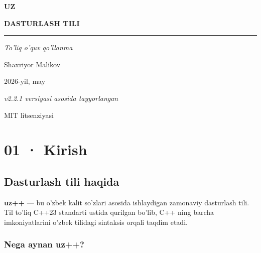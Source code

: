 \documentclass[a4paper,11pt,twoside,openright]{book}
\begin{document}
\frontmatter

\begin{titlepage}
\centering
\vspace*{2.5cm}

{\fontsize{96pt}{96pt}\selectfont\bfseries\sffamily\color{titlecolor}UZ\raisebox{-0.15em}{++}\par}

\vspace{1cm}

{\Huge\bfseries\sffamily\color{titlecolor}DASTURLASH TILI\par}

\vspace{0.5cm}
{\color{rulecolor}\rule{0.5\textwidth}{1pt}\par}
\vspace{1.5cm}

{\LARGE\itshape To'liq o'quv qo'llanma\par}

\vspace{4cm}

{\Large\sffamily Shaxriyor Malikov\par}
\vspace{0.5cm}
{\large 2026-yil, may\par}

\vfill

{\small\itshape v2.2.1 versiyasi asosida tayyorlangan\par}
{\small MIT litsenziyasi}
\end{titlepage}

\setcounter{tocdepth}{1}
\tableofcontents
\cleardoublepage

\mainmatter

\chapter{01 · Kirish}\label{01-kirish}

\section{Dasturlash tili haqida}\label{dasturlash-tili-haqida}

\textbf{uz++} --- bu o'zbek kalit so'zlari asosida ishlaydigan zamonaviy
dasturlash tili. Til to'liq C++23 standarti ustida qurilgan bo'lib, C++ ning
barcha imkoniyatlarini o'zbek tilidagi sintaksis orqali taqdim etadi.

\subsection{Nega aynan uz++?}\label{nega-aynan-uz}
\end{document}
